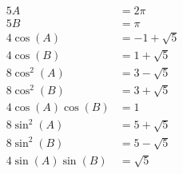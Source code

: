 \begin{align*}

5A &= {2\pi} \\
5B &= {\pi} \\
4\cos(A) &=  -1 + \sqrt{5} \\
4\cos(B) &=   1 + \sqrt{5} \\

8\cos^2(A) &= { 3 - \sqrt{5}} \\
8\cos^2(B) &= { 3 + \sqrt{5}} \\

4\cos(A)\cos(B) &= 1 \\

8\sin^2(A) &= 5 + \sqrt{5} \\
8\sin^2(B) &= 5 - \sqrt{5} \\
4\sin(A)\sin(B) &= \sqrt{5}

\end{align*}